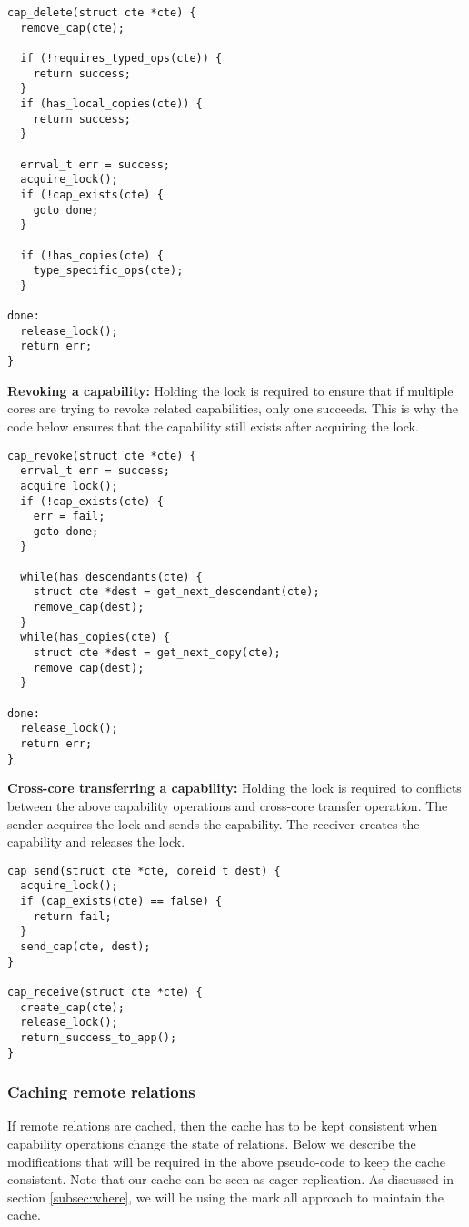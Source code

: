 \documentclass[a4paper,twoside]{report} %
\begin{document}
\begin{verbatim}
cap_delete(struct cte *cte) {
  remove_cap(cte);

  if (!requires_typed_ops(cte)) {
    return success;
  }
  if (has_local_copies(cte)) {
    return success;
  }

  errval_t err = success;
  acquire_lock();
  if (!cap_exists(cte) {
    goto done;
  }

  if (!has_copies(cte) {
    type_specific_ops(cte);
  }

done:
  release_lock();
  return err;
}
\end{verbatim}

\textbf{Revoking a capability:} Holding the lock is required to ensure
that if multiple cores are trying to revoke related capabilities, only
one succeeds. This is why the code below ensures that the capability
still exists after acquiring the lock.

\begin{verbatim}
cap_revoke(struct cte *cte) {
  errval_t err = success;
  acquire_lock();
  if (!cap_exists(cte) {
    err = fail;
    goto done;
  }

  while(has_descendants(cte) {
    struct cte *dest = get_next_descendant(cte);
    remove_cap(dest);
  }
  while(has_copies(cte) {
    struct cte *dest = get_next_copy(cte);
    remove_cap(dest);
  }

done:
  release_lock();
  return err;
}
\end{verbatim}

\textbf{Cross-core transferring a capability:} Holding the lock is
required to conflicts between the above capability operations and
cross-core transfer operation. The sender acquires the lock and sends
the capability. The receiver creates the capability and releases the
lock.

\begin{verbatim}
cap_send(struct cte *cte, coreid_t dest) {
  acquire_lock();
  if (cap_exists(cte) == false) {
    return fail;
  }
  send_cap(cte, dest);
}

cap_receive(struct cte *cte) {
  create_cap(cte);
  release_lock();
  return_success_to_app();
}
\end{verbatim}

\subsubsection{Caching remote relations}
If remote relations are cached, then the cache has to be kept
consistent when capability operations change the state of
relations. Below we describe the modifications that will be required
in the above pseudo-code to keep the cache consistent. Note that our
cache can be seen as eager replication. As discussed in section
\ref{subsec:where}, we will be using the mark all approach to maintain
the cache.
\end{document}
